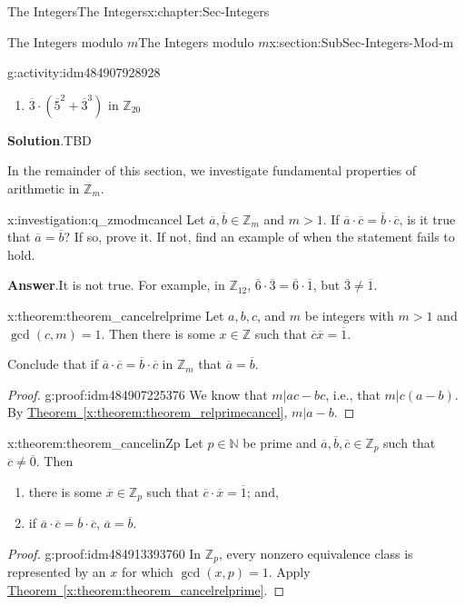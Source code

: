 \documentclass[oneside,10pt,]{book}
\newcommand{\blocktitlefont}{\relax}
\newcommand{\xreffont}{\relax}
\numberwithin{equation}{section}
\def\Z{{\mathbb Z}}
\def\N{{\mathbb N}}
\begin{document}
\begin{chapterptx}{The Integers}{}{The Integers}{}{}{x:chapter:Sec-Integers}
\begin{sectionptx}{The Integers modulo \(m\)}{}{The Integers modulo \(m\)}{}{}{x:section:SubSec-Integers-Mod-m}
\begin{activity}{}{g:activity:idm484907928928}
\begin{enumerate}
\item{}\(\overline{3}\cdot(\overline{5}^2+\overline{3}^3)\) in \(\Z_{20}\)%
\end{enumerate}
\par\smallskip%
\noindent\textbf{\blocktitlefont Solution}.\hypertarget{g:solution:idm484906920016}{}\quad{}TBD\end{activity}
In the remainder of this section, we investigate fundamental properties of arithmetic in \(\Z_m\).%
\begin{investigation}{}{x:investigation:q_zmodmcancel}%
Let \(\overline{a},\overline{b}\in \Z_m\) and \(m > 1\). If \(\overline{a}\cdot \overline{c} = \overline{b}\cdot \overline{c}\), is it true that \(\overline{a} = \overline{b}\)? If so, prove it. If not, find an example of when the statement fails to hold.%
\par\smallskip%
\noindent\textbf{\blocktitlefont Answer}.\hypertarget{g:answer:idm484907060032}{}\quad{}It is not true. For example, in \(\Z_{12}\), \(\overline{6}\cdot \overline{3} = \overline{6}\cdot\overline{1}\), but \(\overline{3}\ne \overline{1}\).%
\end{investigation}
\begin{theorem}{}{}{x:theorem:theorem_cancelrelprime}%
Let \(a,b,c\), and \(m\) be integers with \(m > 1\) and \(\gcd(c,m)=1\). Then there is some \(x\in \Z\) such that \(\overline{c} \overline{x} = \overline{1}\).%
\par
Conclude that if \(\overline{a} \cdot\overline{c} = \overline{b}\cdot\overline{c}\) in \(\Z_m\) that \(\overline{a} = \overline{b}\).%
\end{theorem}
\begin{proof}{}{g:proof:idm484907225376}
We know that \(m|ac-bc\), i.e., that \(m|c(a-b)\). By \hyperref[x:theorem:theorem_relprimecancel]{Theorem~{\xreffont\ref{x:theorem:theorem_relprimecancel}}}, \(m|a-b\).%
\end{proof}
\begin{theorem}{}{}{x:theorem:theorem_cancelinZp}%
Let \(p\in \N\) be prime and \(\overline{a},\overline{b},\overline{c}\in \Z_p\) such that \(\overline{c}\ne \overline{0}\). Then%
\begin{enumerate}
\item{}there is some \(\overline{x}\in \Z_p\) such that \(\overline{c}\cdot \overline{x} = \overline{1}\); and,%
\item{}if \(\overline{a} \cdot\overline{c} = \overline{b}\cdot\overline{c}\), \(\overline{a} = \overline{b}\).%
\end{enumerate}
%
\end{theorem}
\begin{proof}{}{g:proof:idm484913393760}
In \(\Z_p\), every nonzero equivalence class is represented by an \(x\) for which \(\gcd(x,p) = 1\). Apply \hyperref[x:theorem:theorem_cancelrelprime]{Theorem~{\xreffont\ref{x:theorem:theorem_cancelrelprime}}}.%
\end{proof}
\end{sectionptx}
\end{chapterptx}
\end{document}
